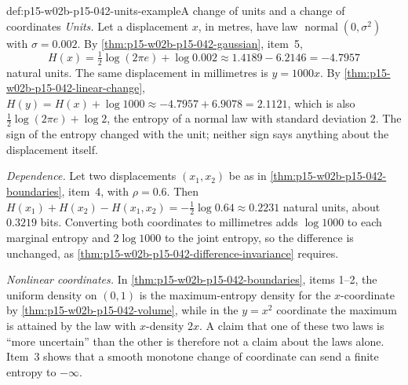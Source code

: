 \begin{hbexample}{def:p15-w02b-p15-042-units-example}{A change of units and a change of coordinates}
\emph{Units.} Let a displacement \(x\), in metres, have law
\(\operatorname{normal}(0,\sigma^2)\) with \(\sigma=0.002\). By
\cref{thm:p15-w02b-p15-042-gaussian}, item~5,
\[
 H(x)=\tfrac12\log(2\pi e)+\log0.002\approx1.4189-6.2146=-4.7957
\]
natural units. The same displacement in millimetres is \(y=1000x\). By
\cref{thm:p15-w02b-p15-042-linear-change},
\(H(y)=H(x)+\log1000\approx-4.7957+6.9078=2.1121\), which is also
\(\tfrac12\log(2\pi e)+\log2\), the entropy of a normal law with standard
deviation \(2\). The sign of the entropy changed with the unit; neither sign
says anything about the displacement itself.

\emph{Dependence.} Let two displacements \((x_1,x_2)\) be as in
\cref{thm:p15-w02b-p15-042-boundaries}, item~4, with \(\rho=0.6\). Then
\(H(x_1)+H(x_2)-H(x_1,x_2)=-\tfrac12\log0.64\approx0.2231\) natural units,
about \(0.3219\) bits. Converting both coordinates to millimetres adds
\(\log1000\) to each marginal entropy and \(2\log1000\) to the joint entropy,
so the difference is unchanged, as
\cref{thm:p15-w02b-p15-042-difference-invariance} requires.

\emph{Nonlinear coordinates.} In
\cref{thm:p15-w02b-p15-042-boundaries}, items 1--2, the uniform density on
\((0,1)\) is the maximum-entropy density for the \(x\)-coordinate by
\cref{thm:p15-w02b-p15-042-volume}, while in the \(y=x^2\) coordinate the
maximum is attained by the law with \(x\)-density \(2x\). A claim that one of
these two laws is ``more uncertain'' than the other is therefore not a claim
about the laws alone. Item~3 shows that a smooth monotone change of coordinate
can send a finite entropy to \(-\infty\).
\end{hbexample}

